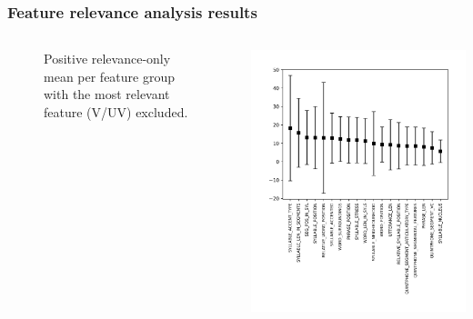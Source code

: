 \documentclass[a4paper,9pt]{beamer}
\theoremstyle{mytheoremstyle}
\begin{document}
\begin{frame}
\frametitle{Feature relevance analysis results}
\begin{columns}
\begin{figure}
	\caption{Positive relevance-only mean per feature group with the most relevant feature (V/UV) excluded.}
\end{figure}
\begin{center}
  \includegraphics[width=\textwidth]{res/feature_relevance_ranking_-_mean_(positive_only_sum)_-_general_feature_categories_-_no_vuv}
\end{center}
\end{columns}
\end{frame}
\end{document}
